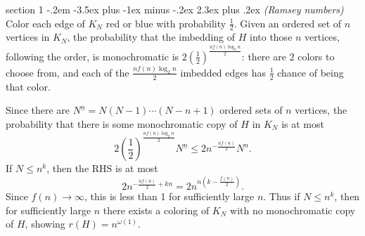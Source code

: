 \documentclass[12pt]{article}
\makeatletter
\theoremstyle{norm}
\newcommand{\rc}[1]{\frac{1}{#1}}
\newcommand{\om}[0]{\omega}
\newcommand{\pa}[1]{\left( {#1} \right)}
\newcommand{\fp}[1]{^{\underline{#1}}}
\newcommand{\prc}[1]{\pa{\rc{#1}}}
\newcommand{\iy}[0]{\infty}
\newenvironment{problem}{\@startsection
       {section}
       {1}
       {-.2em}
       {-3.5ex plus -1ex minus -.2ex}
       {2.3ex plus .2ex}
       {\pagebreak[3]%
       \large\bf\noindent{Problem }
       }
       }
       {%
       }
\makeatother
\begin{document}
\begin{problem} {\it (Ramsey numbers)}
Color each edge of $K_N$ red or blue with probability $\rc 2$. 
Given an ordered set of $n$ vertices in $K_N$, the probability that the imbedding of $H$ into those $n$ vertices, following the order, is monochromatic is $2\prc 2^{\frac{nf(n)\log_2 n}{2}}$: there are 2 colors to choose from, and each of the $\frac{nf(n)\log_2 n}{2}$ imbedded edges has $\rc 2$ chance of being that color.

Since there are $N\fp n=N(N-1)\cdots (N-n+1)$ ordered sets of $n$ vertices, the probability that there is some monochromatic copy of $H$ in $K_N$ is at most
\[
2\prc 2^{\frac{nf(n)\log_2 n}{2}}N\fp n
\le 2n^{-\frac{nf(n)}{2}} N^n.
\]
If $N\le n^k$, then the RHS is at most
\[
2n^{-\frac{nf(n)}{2}+kn}=2n^{n\pa{k-\frac{f(n)}2}}.
\]
Since $f(n)\to \iy$, this is less than 1 for sufficiently large $n$. Thus if $N\le n^k$, then for sufficiently large $n$ there exists a coloring of $K_N$ with no monochromatic copy of $H$, showing $r(H)=n^{\om(1)}$.
\end{problem}
\end{document}
